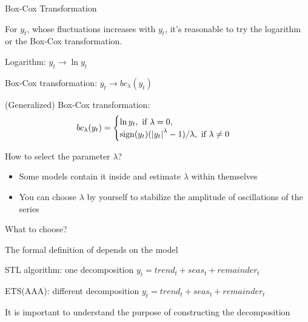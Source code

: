 \begin{frame}{Box-Cox Transformation}
	
	
	For $y_t$, whose fluctuations  increases with $y_t$, \alert{it's reasonable to try} the logarithm
	or the Box-Cox transformation.
	
	\pause
	Logarithm: $y_t \to \ln y_t$
	
	Box-Cox transformation: $y_t \to bc_{\lambda}(y_t)$
	
	\pause
	
	(\alert{Generalized}) Box-Cox transformation:
	\begin{equation*}
		bc_{\lambda}(y_t) =
		\begin{cases} \ln y_t, \text{ if } \lambda = 0, \\
			\operatorname{sign} (y_t) (\abs{y_t}^{\lambda} - 1)/\lambda, \text { if } \lambda \neq 0
		\end{cases}
	\end{equation*}
	
	
	\pause
	
	How to \alert{select} the parameter $\lambda$?
	
	\pause
	
	
	\begin{itemize}[<+->]
		\item Some models contain it inside  and \alert{estimate} $\lambda$ within themselves
		\item You can choose $\lambda$ by yourself to \alert{stabilize the amplitude} of oscillations of the series
		
	\end{itemize}
	
	
\end{frame}






\begin{frame}{What to choose?}
	
	The formal definition of \alert{depends on the model}
	
	\pause
	\alert{STL algorithm}: one decomposition $y_t = trend_t + seas_t + remainder_t$
	
	\pause
	\alert{ETS(AAA)}: different decomposition $y_t = trend_t + seas_t + remainder_t$
	
	
	\pause
	It is important to understand the \alert{purpose of constructing} the decomposition
	
\end{frame}

